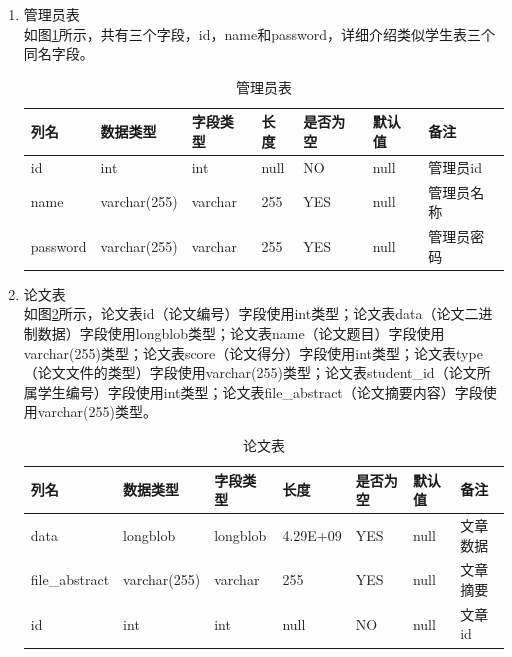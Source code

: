 \begin{enumerate}
\begin{table}[H]
          \end{table}
    \item 管理员表\\
          如图\ref{db-admin}所示，共有三个字段，id，name和password，详细介绍类似学生表三个同名字段。
          \begin{table}[H]
              \centering
              \song\wuhao
              \caption{管理员表}
              \label{db-admin}
              \begin{tabular}{|l|l|l|l|l|l|l|}
                  \hline
                  列名     & 数据类型     & 字段类型 & 长度 & 是否为空 & 默认值 & 备注       \\ \hline
                  id       & int          & int      & null & NO       & null   & 管理员id   \\ \hline
                  name     & varchar(255) & varchar  & 255  & YES      & null   & 管理员名称 \\ \hline
                  password & varchar(255) & varchar  & 255  & YES      & null   & 管理员密码 \\ \hline
              \end{tabular}
          \end{table}
    \item 论文表\\
          如图\ref{db-file}所示，论文表id（论文编号）字段使用int类型；论文表data（论文二进制数据）字段使用longblob类型；论文表name（论文题目）字段使用varchar(255)类型；论文表score（论文得分）字段使用int类型；论文表type（论文文件的类型）字段使用varchar(255)类型；论文表student\_id（论文所属学生编号）字段使用int类型；论文表file\_abstract（论文摘要内容）字段使用varchar(255)类型。
          \begin{table}[H]
              \centering
              \song\wuhao
              \caption{论文表}
              \label{db-file}
              \begin{tabular}{|l|l|l|l|l|l|l|}
                  \hline
                  列名           & 数据类型     & 字段类型 & 长度     & 是否为空 & 默认值 & 备注             \\ \hline
                  data           & longblob     & longblob & 4.29E+09 & YES      & null   & 文章数据         \\ \hline
                  file\_abstract & varchar(255) & varchar  & 255      & YES      & null   & 文章摘要         \\ \hline
                  id             & int          & int      & null     & NO       & null   & 文章id           \\ \hline

\end{tabular}
\end{table}
\end{enumerate}
